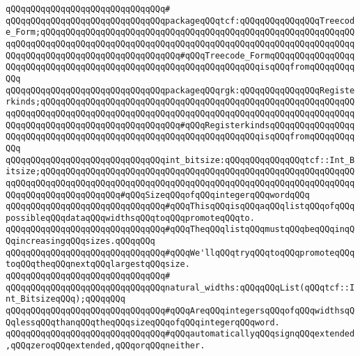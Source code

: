 \verb|qQQqqQQqqQQqqQQqqQQqqQQqqQQqqQQq#|\newline
\verb|qQQqqQQqqQQqqQQqqQQqqQQqqQQqqQQqpackageqQQqtcf:qQQqqQQqqQQqqQQqTreecode_Form;qQQqqQQqqQQqqQQqqQQqqQQqqQQqqQQqqQQqqQQqqQQqqQQqqQQqqQQqqQQqqQQqqQQqqQQqqQQqqQQqqQQqqQQqqQQqqQQqqQQqqQQqqQQqqQQqqQQqqQQqqQQqqQQqqQQqqQQqqQQqqQQqqQQqqQQqqQQqqQQqqQQqqQQq#qQQqTreecode_FormqQQqqQQqqQQqqQQqqQQqqQQqqQQqqQQqqQQqqQQqqQQqqQQqqQQqqQQqqQQqqQQqqQQqisqQQqfromqQQqqQQqqQQq|\newline
\verb|qQQqqQQqqQQqqQQqqQQqqQQqqQQqqQQqpackageqQQqrgk:qQQqqQQqqQQqqQQqRegisterkinds;qQQqqQQqqQQqqQQqqQQqqQQqqQQqqQQqqQQqqQQqqQQqqQQqqQQqqQQqqQQqqQQqqQQqqQQqqQQqqQQqqQQqqQQqqQQqqQQqqQQqqQQqqQQqqQQqqQQqqQQqqQQqqQQqqQQqqQQqqQQqqQQqqQQqqQQqqQQqqQQqqQQqqQQq#qQQqRegisterkindsqQQqqQQqqQQqqQQqqQQqqQQqqQQqqQQqqQQqqQQqqQQqqQQqqQQqqQQqqQQqqQQqqQQqisqQQqfromqQQqqQQqqQQq|\newline
\newline
\verb|qQQqqQQqqQQqqQQqqQQqqQQqqQQqqQQqint_bitsize:qQQqqQQqqQQqqQQqtcf::Int_Bitsize;qQQqqQQqqQQqqQQqqQQqqQQqqQQqqQQqqQQqqQQqqQQqqQQqqQQqqQQqqQQqqQQqqQQqqQQqqQQqqQQqqQQqqQQqqQQqqQQqqQQqqQQqqQQqqQQqqQQqqQQqqQQqqQQqqQQqqQQqqQQqqQQqqQQqqQQqqQQq#qQQqSizeqQQqofqQQqintegerqQQqwordqQQq|\newline
\newline
\verb|qQQqqQQqqQQqqQQqqQQqqQQqqQQqqQQq#qQQqThisqQQqisqQQqaqQQqlistqQQqofqQQqpossibleqQQqdataqQQqwidthsqQQqtoqQQqpromoteqQQqto.|\newline
\verb|qQQqqQQqqQQqqQQqqQQqqQQqqQQqqQQq#qQQqTheqQQqlistqQQqmustqQQqbeqQQqinqQQqincreasingqQQqsizes.qQQqqQQq|\newline
\verb|qQQqqQQqqQQqqQQqqQQqqQQqqQQqqQQq#qQQqWe'llqQQqtryqQQqtoqQQqpromoteqQQqtoqQQqtheqQQqnextqQQqlargestqQQqsize.|\newline
\verb|qQQqqQQqqQQqqQQqqQQqqQQqqQQqqQQq#|\newline
\verb|qQQqqQQqqQQqqQQqqQQqqQQqqQQqqQQqnatural_widths:qQQqqQQqList(qQQqtcf::Int_BitsizeqQQq);qQQqqQQq|\newline
\newline
\newline
\verb|qQQqqQQqqQQqqQQqqQQqqQQqqQQqqQQq#qQQqAreqQQqintegersqQQqofqQQqwidthsqQQqlessqQQqthanqQQqtheqQQqsizeqQQqofqQQqintegerqQQqword.|\newline
\verb|qQQqqQQqqQQqqQQqqQQqqQQqqQQqqQQq#qQQqautomaticallyqQQqsignqQQqextended,qQQqzeroqQQqextended,qQQqorqQQqneither.|\newline
